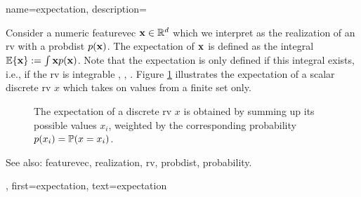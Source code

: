 {name={expectation}, 
  description={Consider a numeric \gls{featurevec} ${\bf x} \in \mathbb{R}^{d}$ 
	which we interpret as the \gls{realization} of an \gls{rv} with a \gls{probdist} $p({\bf x})$. 
	The expectation of ${\bf x}$ is defined as the integral $\mathbb{E} \{ {\bf x} \} := \int {\bf x} p({\bf x})$. 
	Note that the expectation is only defined if this integral exists, i.e., if the \gls{rv} is integrable 
	\cite{RudinBookPrinciplesMatheAnalysis}, \cite{BillingsleyProbMeasure}, \cite{HalmosMeasure}. 
	Figure \ref{fig_expect_discrete_dict} illustrates the expectation of a scalar discrete \gls{rv} $x$ which takes on values 
	from a finite set only. 
   \begin{figure}[H]
   	\begin{center}
\end{center}
\vspace*{-5mm}
\caption{The expectation of a discrete \gls{rv} $x$ is obtained by summing up its possible values $x_{i}$, weighted 
	by the corresponding \gls{probability} $p(x_i) = \mathbb{P}({x= x_i})$. \label{fig_expect_discrete_dict}}
 \end{figure}
		See also: \gls{featurevec}, \gls{realization}, \gls{rv}, \gls{probdist}, \gls{probability}.},
first={expectation},
text={expectation}
}

